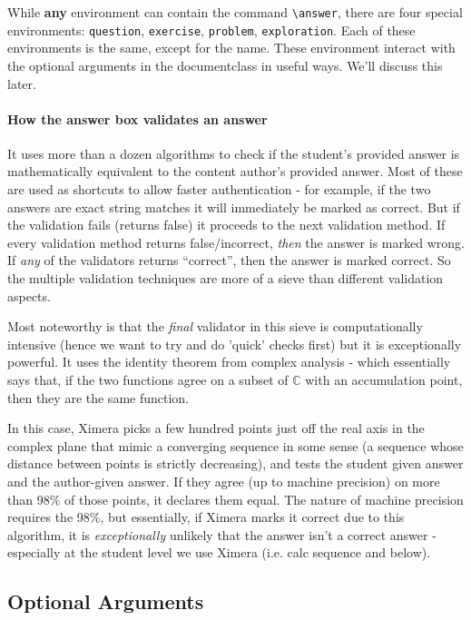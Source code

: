 \documentclass{ximera}
\begin{document}
While \textbf{any} environment can contain the command \verb|\answer|,
there are four special environments: \verb|question|, \verb|exercise|,
\verb|problem|, \verb|exploration|. Each of these environments is the
same, except for the name. These environment interact with the
optional arguments in the documentclass in useful ways. We'll discuss
this later.

\paragraph{How the answer box validates an answer}

It uses more than a dozen algorithms to check if the student's provided answer
is mathematically equivalent to the content author's provided answer. Most of
these are used as shortcuts to allow faster authentication - for example, if
the two answers are exact string matches it will immediately be marked as
correct. But if the validation fails (returns false) it proceeds to the next
validation method. If every validation method returns false/incorrect,
\textit{then} the answer is marked wrong. If \textit{any} of the validators
returns ``correct'', then the answer is marked correct. So the multiple
validation techniques are more of a sieve than different validation aspects.

Most noteworthy is that the \textit{final} validator in this sieve is
computationally intensive (hence we want to try and do 'quick' checks first)
but it is exceptionally powerful. It uses the identity theorem from complex
analysis - which essentially says that, if the two functions agree on a subset
of $\mathbb{C}$ with an accumulation point, then they are the same function.

In this case, Ximera picks a few hundred points just off the real axis in the
complex plane that mimic a converging sequence in some sense (a sequence whose
distance between points is strictly decreasing), and tests the student given
answer and the author-given answer. If they agree (up to machine precision) on
more than 98\% of those points, it declares them equal. The nature of machine
precision requires the 98\%, but essentially, if Ximera marks it correct due to
this algorithm, it is \textit{exceptionally} unlikely that the answer isn't a
correct answer - especially at the student level we use Ximera (i.e. calc
sequence and below).

\subsection{Optional Arguments}
\end{document}
